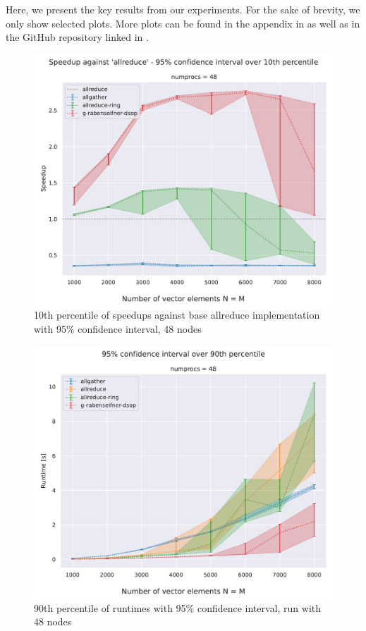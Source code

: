\documentclass[letterpaper]{article}
\begin{document}
Here, we present the key results from our experiments.
For the sake of brevity, we only show selected plots.
More plots can be found in the appendix in  as well as in the GitHub repository linked in .

\begin{figure}[htp]
    \centering
    \includegraphics[width=0.95\columnwidth]{plots/speedup_plot_N_numprocs_48__baseline_allreduce_percentile_10_CI_0.95_with_errorbar.pdf}
    \caption{10th percentile of speedups against base allreduce implementation with 95\% confidence interval, 48 nodes}
    \label{fig:speedup-48-10-95}
\end{figure}

\begin{figure}[htp]
    \centering
    \includegraphics[width=0.95\columnwidth]{plots/runtime_numprocs_48_N_percentile_90_CI_0.95_with_errorbar.pdf}
    \caption{90th percentile of runtimes with 95\% confidence interval, run with 48 nodes}
    \label{fig:runtime-48-90-95}
\end{figure}
\end{document}

